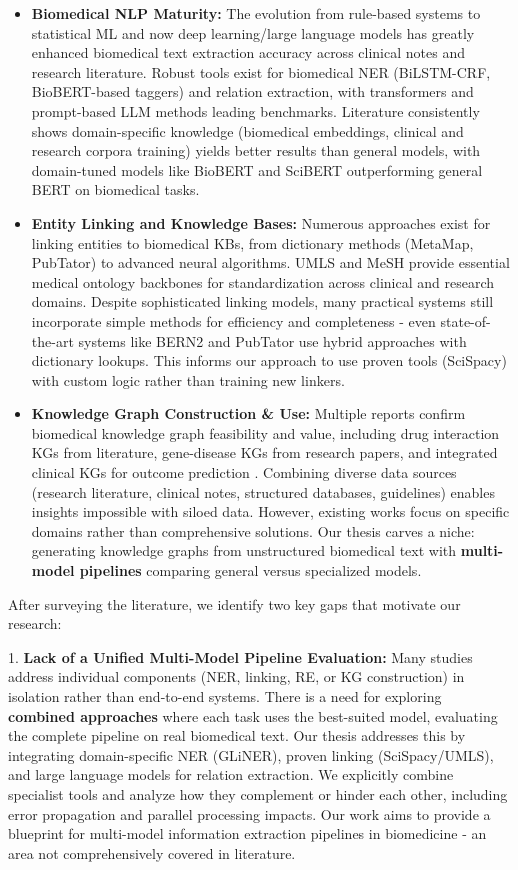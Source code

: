 \begin{itemize}
\item \textbf{Biomedical NLP Maturity:} The evolution from rule-based systems to statistical ML and now deep learning/large language models has greatly enhanced biomedical text extraction accuracy across clinical notes and research literature. Robust tools exist for biomedical NER (BiLSTM-CRF, BioBERT-based taggers) and relation extraction, with transformers and prompt-based LLM methods leading benchmarks. Literature consistently shows domain-specific knowledge (biomedical embeddings, clinical and research corpora training) yields better results than general models, with domain-tuned models like BioBERT and SciBERT outperforming general BERT on biomedical tasks.

\item \textbf{Entity Linking and Knowledge Bases:} Numerous approaches exist for linking entities to biomedical KBs, from dictionary methods (MetaMap, PubTator) to advanced neural algorithms. UMLS and MeSH provide essential medical ontology backbones for standardization across clinical and research domains. Despite sophisticated linking models, many practical systems still incorporate simple methods for efficiency and completeness - even state-of-the-art systems like BERN2 and PubTator use hybrid approaches with dictionary lookups. This informs our approach to use proven tools (SciSpacy) with custom logic rather than training new linkers.

\item \textbf{Knowledge Graph Construction \& Use:} Multiple reports confirm biomedical knowledge graph feasibility and value, including drug interaction KGs from literature, gene-disease KGs from research papers, and integrated clinical KGs for outcome prediction \parencite{Rotmensch2017}. Combining diverse data sources (research literature, clinical notes, structured databases, guidelines) enables insights impossible with siloed data. However, existing works focus on specific domains rather than comprehensive solutions. Our thesis carves a niche: generating knowledge graphs from unstructured biomedical text with \textbf{multi-model pipelines} comparing general versus specialized models.
\end{itemize}

After surveying the literature, we identify two key gaps that motivate our research:

1. \textbf{Lack of a Unified Multi-Model Pipeline Evaluation:} Many studies address individual components (NER, linking, RE, or KG construction) in isolation rather than end-to-end systems. There is a need for exploring \textbf{combined approaches} where each task uses the best-suited model, evaluating the complete pipeline on real biomedical text. Our thesis addresses this by integrating domain-specific NER (GLiNER), proven linking (SciSpacy/UMLS), and large language models for relation extraction. We explicitly combine specialist tools and analyze how they complement or hinder each other, including error propagation and parallel processing impacts. Our work aims to provide a blueprint for multi-model information extraction pipelines in biomedicine - an area not comprehensively covered in literature.

